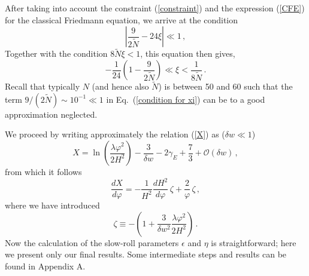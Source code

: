 After taking into account the constraint
(\ref{constraint}) and the expression (\ref{CFE})
for the classical Friedmann equation, we arrive at the condition
\begin{equation}
\left|\frac{9}{2\tilde{N}}-24\xi\right|\ll 1
\,,
\end{equation}
Together with the condition $8\tilde N\xi<1$, this equation then gives,
\begin{equation}
-\frac{1}{24}\left(1-\frac{9}{2\tilde N}\right)
           \ll \xi < \frac{1}{8\tilde{N}}
\,.
\label{condition for xi}
\end{equation}
Recall that typically $N$ (and hence also $\tilde{N}$)
is between 50 and 60 such that the term $9/(2\tilde N)\sim 10^{-1}\ll 1$ in
Eq.~(\ref{condition for xi}) can be to a good approximation neglected.

 We proceed by writing approximately the relation (\ref{X}) as
($\delta w\ll 1$)
\begin{equation}
X = \ln\left(\frac{\lambda\varphi^2}{2H^2}\right) -
\frac{3}{\delta w} - 2\gamma_E + \frac{7}{3} + \mathcal{O}(\delta
w )\,, \label{X2}
\end{equation}
from which it follows
\begin{equation}
\frac{dX}{d\varphi} = -\frac{1}{H^2}\frac{dH^2}{d\varphi}\,\zeta +
\frac{2}{\varphi}\,\zeta\,, \label{dXdvarphi}
\end{equation}
where we have introduced
\begin{equation}
\zeta\equiv -\left(1 + \frac{3}{\delta w
^2}\frac{\lambda\varphi^2}{2H^2}\right)\,. \label{zeta}
\end{equation}
Now the calculation of the slow-roll parameters $\epsilon$ and
$\eta$ is straightforward;
here we present only our final results. Some intermediate steps
and results can be found in Appendix A.


